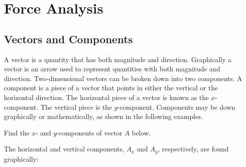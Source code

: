 \documentclass[main.tex]{subfiles}
\begin{document}
\section{Force Analysis}

\subsection{Vectors and Components}

A \gls{vector} is a quantity that has both magnitude and direction. Graphically a vector is an arrow used to represent quantities with both magnitude and direction. Two-dimensional vectors can be broken down into two components. A \gls{component} is a piece of a vector that points in either the vertical or the horizontal direction. The horizontal piece of a vector is known as the $x$-component. The vertical piece is the $y$-component. Components may be down graphically or mathematically, as shown in the following examples.

\begin{example}
    Find the $x$- and $y$-components of vector $A$ below.
\end{example}

\begin{center}
\def\Ax{6}
\def\Ay{4}
\end{center}

\clearpage
\Solution The horizontal and vertical components, $A_x$ and $A_y$, respectively, are found graphically:

\begin{center}
\def\Ax{6}
\def\Ay{4}
\end{center}
\end{document}
